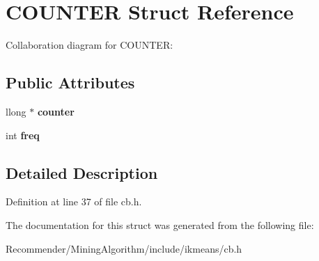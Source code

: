 \section{COUNTER Struct Reference}
\label{structCOUNTER}
Collaboration diagram for COUNTER:\subsection*{Public Attributes}
\begin{CompactItemize}
\item 
llong $\ast$ {\bf counter}\label{structCOUNTER_f3f06271fb2d809c942eb426c01a2c7c}

\item 
int {\bf freq}\label{structCOUNTER_e0d22272b68e75d19ac0b80c01f806b6}

\end{CompactItemize}


\subsection{Detailed Description}




Definition at line 37 of file cb.h.

The documentation for this struct was generated from the following file:\begin{CompactItemize}
\item 
Recommender/MiningAlgorithm/include/ikmeans/cb.h\end{CompactItemize}
